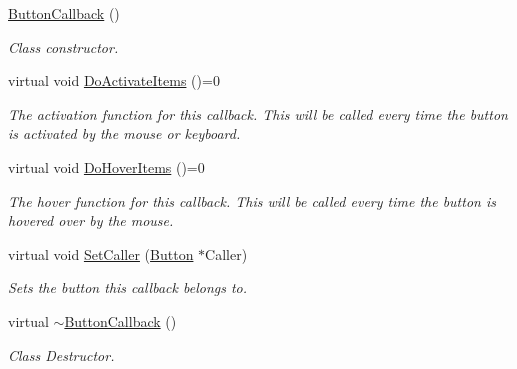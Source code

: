 \begin{DoxyCompactItemize}
\item 
\hyperlink{classMezzanine_1_1UI_1_1ButtonCallback_af7cd7252696a7c4a47e0753eeef41d72}{ButtonCallback} ()
\begin{DoxyCompactList}\small\item\em Class constructor. \item\end{DoxyCompactList}\item 
\hypertarget{classMezzanine_1_1UI_1_1ButtonCallback_a4e5b608adea7aa2b8589f2b1644ef698}{
virtual void \hyperlink{classMezzanine_1_1UI_1_1ButtonCallback_a4e5b608adea7aa2b8589f2b1644ef698}{DoActivateItems} ()=0}
\label{classMezzanine_1_1UI_1_1ButtonCallback_a4e5b608adea7aa2b8589f2b1644ef698}

\begin{DoxyCompactList}\small\item\em The activation function for this callback. This will be called every time the button is activated by the mouse or keyboard. \item\end{DoxyCompactList}\item 
\hypertarget{classMezzanine_1_1UI_1_1ButtonCallback_a03454a17a979a86a72a0c3afae69737f}{
virtual void \hyperlink{classMezzanine_1_1UI_1_1ButtonCallback_a03454a17a979a86a72a0c3afae69737f}{DoHoverItems} ()=0}
\label{classMezzanine_1_1UI_1_1ButtonCallback_a03454a17a979a86a72a0c3afae69737f}

\begin{DoxyCompactList}\small\item\em The hover function for this callback. This will be called every time the button is hovered over by the mouse. \item\end{DoxyCompactList}\item 
\hypertarget{classMezzanine_1_1UI_1_1ButtonCallback_a59e06318745a208789d21bde7ad01349}{
virtual void \hyperlink{classMezzanine_1_1UI_1_1ButtonCallback_a59e06318745a208789d21bde7ad01349}{SetCaller} (\hyperlink{classMezzanine_1_1UI_1_1Button}{Button} $\ast$Caller)}
\label{classMezzanine_1_1UI_1_1ButtonCallback_a59e06318745a208789d21bde7ad01349}

\begin{DoxyCompactList}\small\item\em Sets the button this callback belongs to. \item\end{DoxyCompactList}\item 
\hypertarget{classMezzanine_1_1UI_1_1ButtonCallback_a2db8a95ef38e7036d3e31cbf01e8f126}{
virtual \hyperlink{classMezzanine_1_1UI_1_1ButtonCallback_a2db8a95ef38e7036d3e31cbf01e8f126}{$\sim$ButtonCallback} ()}
\label{classMezzanine_1_1UI_1_1ButtonCallback_a2db8a95ef38e7036d3e31cbf01e8f126}

\begin{DoxyCompactList}\small\item\em Class Destructor. \item\end{DoxyCompactList}\end{DoxyCompactItemize}
